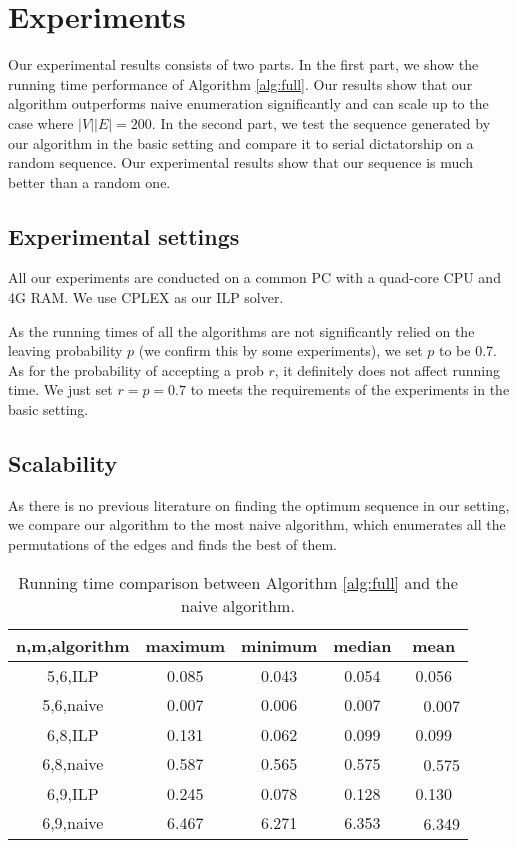 \documentclass[letterpaper]{article}
\begin{document}
\section{Experiments}

Our experimental results consists of two parts.
In the first part, we show the running time performance of Algorithm \ref{alg:full}.
Our results show that our algorithm outperforms naive enumeration significantly and can scale up to the case where $|V||E|=200$.
In the second part, we test the sequence generated by our algorithm in the basic setting and compare it to serial dictatorship on a random sequence. Our experimental results show that our sequence is much better than a random one.

\subsection{Experimental settings}
All our experiments are conducted on a common PC with a quad-core CPU and 4G RAM.
We use CPLEX as our ILP solver.

As the running times of all the algorithms are not significantly relied on the leaving probability $p$ (we confirm this by some experiments), we set  $p$ to be 0.7.
As for the probability of accepting a prob $r$, it definitely does not affect running time. We just set $r=p=0.7$ to meets the requirements of the experiments in the basic setting.

\subsection{Scalability}

As there is no previous literature on finding the optimum sequence in our setting, we compare our algorithm to the most naive algorithm, which enumerates all the permutations of the edges and finds the best of them.
\begin{table}
	\caption{Running time comparison between Algorithm \ref{alg:full} and the naive algorithm.}
	\label{tab1}
	\begin{tabular}{ccccc}
		\hline
		n,m,algorithm & maximum & minimum & median & mean\\ \hline
		5,6,ILP & 0.085& 0.043& 0.054& 0.056\\
		5,6,naive & 0.007& 0.006& 0.007&　0.007\\
		6,8,ILP & 0.131& 0.062& 0.099& 0.099\\
		6,8,naive & 0.587& 0.565& 0.575&　0.575\\
		6,9,ILP & 0.245& 0.078& 0.128& 0.130\\
		6,9,naive & 6.467& 6.271& 6.353&　6.349\\ \hline
	\end{tabular}
\end{table}
\end{document}
